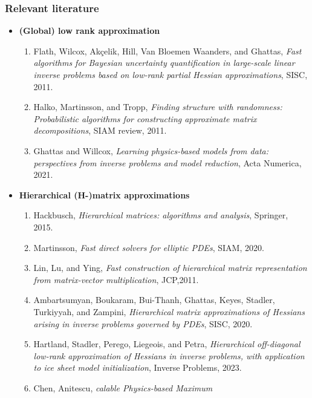 \documentclass[10pt,final,xcolor=dvipsnames]{beamer}
\begin{document}
\begin{frame}
  \frametitle{Relevant literature}
  \scriptsize
  \vspace{-0.04in}
  \begin{itemize}
  \item {\bf (Global) low rank approximation}
    \vspace{0.02in}
    \begin{enumerate}
      \scriptsize
    \item Flath, Wilcox, Ak\c{c}elik, Hill, Van Bloemen Waanders, and
      Ghattas, {\it Fast algorithms for Bayesian uncertainty
        quantification in large-scale linear inverse problems based on
        low-rank partial Hessian approximations}, SISC, 2011.
    \item Halko, Martinsson, and Tropp, {\it Finding structure with
      randomness: Probabilistic algorithms for constructing
      approximate matrix decompositions}, SIAM review, 2011.
    \item Ghattas and Willcox, {\it Learning physics-based models from
      data: perspectives from inverse problems and model reduction},
      Acta Numerica, 2021.
    \end{enumerate}
    \vspace{-0.02in}
  \item {\bf Hierarchical (H-)matrix approximations}
    \vspace{0.02in}
    \begin{enumerate}
      \scriptsize
    \item Hackbusch, {\it Hierarchical matrices: algorithms and
      analysis}, Springer, 2015.
    \item Martinsson, {\it Fast direct solvers for elliptic PDEs},
      SIAM, 2020.
    \item Lin, Lu, and Ying, {\it Fast construction of hierarchical
      matrix representation from matrix-vector multiplication},
      JCP,2011.
    \item Ambartsumyan, Boukaram, Bui-Thanh, Ghattas, Keyes, Stadler,
      Turkiyyah, and Zampini, {\it Hierarchical matrix approximations
        of Hessians arising in inverse problems governed by PDEs},
      SISC, 2020.
    \item Hartland, Stadler, Perego, Liegeois, and Petra, {\it
      Hierarchical off-diagonal low-rank approximation of Hessians in
      inverse problems, with application to ice sheet model
      initialization}, Inverse Problems, 2023.
    \item Chen, Anitescu, {\it calable Physics-based Maximum
}
\end{enumerate}
\end{itemize}
\end{frame}
\end{document}
